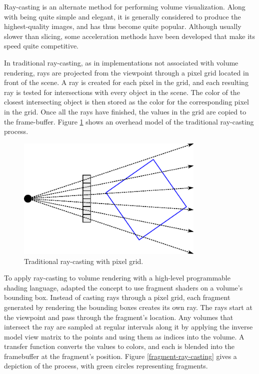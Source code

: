 \documentclass{report}
\begin{document}
Ray-casting is an alternate method for performing volume visualization.  Along
with being quite simple and elegant, it is generally considered to produce the
highest-quality images, and has thus become quite popular.  Although usually
slower than slicing, some acceleration methods have been developed that make its
speed quite competitive.

In traditional ray-casting, as in implementations not associated with volume
rendering, rays are projected from the viewpoint through a pixel grid located in
front of the scene.  A ray is created for each pixel in the grid, and each
resulting ray is tested for intersections with every object in the scene.  The
color of the closest intersecting object is then stored as the color for the
corresponding pixel in the grid.  Once all the rays have finished, the values in
the grid are copied to the frame-buffer.  Figure \ref{traditional-ray-casting}
shows an overhead model of the traditional ray-casting process.

\begin{figure}
\centering
\includegraphics[width=0.8\textwidth]{traditional-ray-casting.pdf}
\caption{Traditional ray-casting with pixel grid.}
\label{traditional-ray-casting}
\end{figure}

To apply ray-casting to volume rendering with a high-level programmable shading
language, \cite{Kruger03} adapted the concept to use fragment shaders on a
volume’s bounding box.  Instead of casting rays through a pixel grid, each
fragment generated by rendering the bounding boxes creates its own ray.  The
rays start at the viewpoint and pass through the fragment’s location.  Any
volumes that intersect the ray are sampled at regular intervals along it by
applying the inverse model view matrix to the points and using them as indices
into the volume.  A transfer function converts the values to colors, and each is
blended into the framebuffer at the fragment’s position.  Figure
\ref{fragment-ray-casting} gives a depiction of the process, with green circles
representing fragments.
\end{document}

